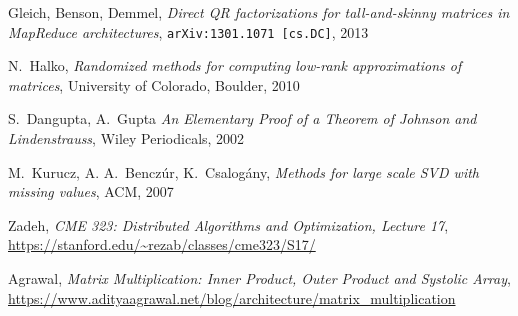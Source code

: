 \documentclass{article}
\begin{document}
\begin{thebibliography}{1}

Gleich, Benson, Demmel, \emph{Direct QR factorizations for tall-and-skinny
  matrices in MapReduce architectures}, {\tt arXiv:1301.1071 [cs.DC]}, 2013

N.~Halko, \emph{Randomized methods for computing low-rank approximations of
  matrices}, University of Colorado, Boulder, 2010

S.~Dangupta, A.~Gupta \emph{An Elementary Proof of a Theorem of Johnson and
  Lindenstrauss}, Wiley Periodicals, 2002

M.~Kurucz, A. A.~Benczúr, K.~Csalogány, \emph{Methods for large scale SVD with
missing values}, ACM, 2007

Zadeh, \emph{CME 323: Distributed Algorithms and Optimization, Lecture 17}, 
\url{https://stanford.edu/~rezab/classes/cme323/S17/}

Agrawal, \emph{Matrix Multiplication: Inner Product, Outer Product and Systolic Array},
\url{https://www.adityaagrawal.net/blog/architecture/matrix_multiplication}
  
\end{thebibliography}
\end{document}
